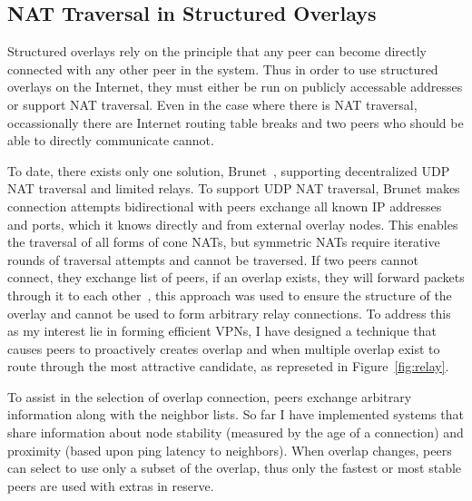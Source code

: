 \subsection{NAT Traversal in Structured Overlays}
Structured overlays rely on the principle that any peer can become directly
connected with any other peer in the system.  Thus in order to use structured
overlays on the Internet, they must either be run on publicly accessable
addresses or support NAT traversal.  Even in the case where there is NAT
traversal, occassionally there are Internet routing table breaks and two
peers who should be able to directly communicate cannot.

To date, there exists only one solution, Brunet~\cite{brunet}, supporting
decentralized UDP NAT traversal and limited relays.  To support UDP NAT
traversal, Brunet makes connection attempts bidirectional with peers exchange
all known IP addresses and ports, which it knows directly and from external
overlay nodes.  This enables the traversal of all forms of cone NATs, but
symmetric NATs require iterative rounds of traversal attempts and cannot be
traversed.  If two peers cannot connect, they exchange list of peers, if an
overlap exists, they will forward packets through it to each
other~\cite{hpdc08_1}, this approach was used to ensure the structure of
the overlay and cannot be used to form arbitrary relay connections.  To address
this as my interest lie in forming efficient VPNs, I have designed a technique
that causes peers to proactively creates overlap and when multiple overlap
exist to route through the most attractive candidate, as represeted in
Figure~\ref{fig:relay}.

To assist in the selection of overlap connection, peers exchange arbitrary
information along with the neighbor lists.  So far I have implemented systems
that share information about node stability (measured by the age of a
connection) and proximity (based upon ping latency to neighbors).  When overlap
changes, peers can select to use only a subset of the overlap, thus only the
fastest or most stable peers are used with extras in reserve.

